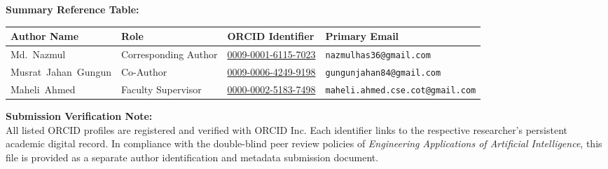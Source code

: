 \documentclass[a4paper,10pt]{article}
\begin{document}
\vspace{1.0ex}
\noindent\textbf{Summary Reference Table:}\\[0.5ex]
\noindent
\small
\begin{tabularx}{\textwidth}{@{}p{3.2cm} p{2.8cm} p{3.8cm} X@{}}
\toprule
\textbf{Author Name} & \textbf{Role} & \textbf{ORCID Identifier} & \textbf{Primary Email} \\
\midrule
Md.~Nazmul & Corresponding Author & \href{https://orcid.org/0009-0001-6115-7023}{0009-0001-6115-7023} & {\footnotesize\texttt{nazmulhas36@gmail.com}} \\
Musrat~Jahan~Gungun & Co-Author & \href{https://orcid.org/0009-0006-4249-9198}{0009-0006-4249-9198} & {\footnotesize\texttt{gungunjahan84@gmail.com}} \\
Maheli~Ahmed & Faculty Supervisor & \href{https://orcid.org/0000-0002-5183-7498}{0000-0002-5183-7498} & {\footnotesize\texttt{maheli.ahmed.cse.cot@gmail.com}} \\
\bottomrule
\end{tabularx}
\normalsize

\vspace{1.5ex}
\noindent\textbf{Submission Verification Note:} \\
All listed ORCID profiles are registered and verified with ORCID Inc. Each identifier links to the respective researcher's persistent academic digital record. In compliance with the double-blind peer review policies of \textit{Engineering Applications of Artificial Intelligence}, this file is provided as a separate author identification and metadata submission document.
\end{document}
